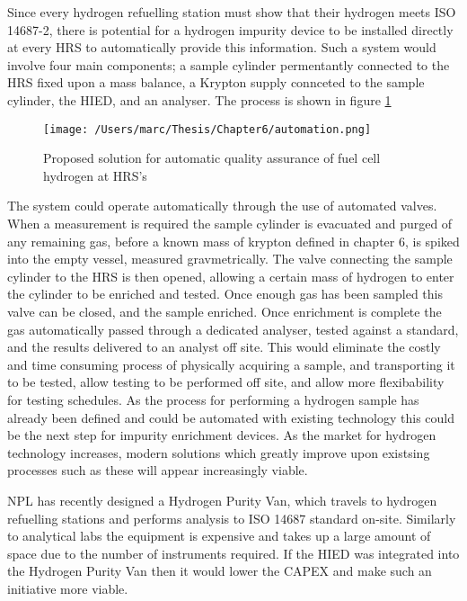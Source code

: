 Since every hydrogen refuelling station must show that their hydrogen meets ISO 14687-2, there is potential for a hydrogen impurity device to be installed directly at every HRS to automatically provide this information. Such a system would involve four main components; a sample cylinder permentantly connected to the HRS fixed upon a mass balance, a Krypton supply connceted to the sample cylinder, the HIED, and an analyser. The process is shown in figure \ref{autoprocedure}

\begin{figure}
    \centering
    \texttt{[image: /Users/marc/Thesis/Chapter6/automation.png]}
    \caption{Proposed solution for automatic quality assurance of fuel cell hydrogen at HRS's}
    \label{autoprocedure}
\end{figure}

The system could operate automatically through the use of automated valves. When a measurement is required the sample cylinder is evacuated and purged of any remaining gas, before a known mass of krypton defined in chapter 6, is spiked into the empty vessel, measured gravmetrically. The valve connecting the sample cylinder to the HRS is then opened, allowing a certain mass of hydrogen to enter the cylinder to be enriched and tested. Once enough gas has been sampled this valve can be closed, and the sample enriched. Once enrichment is complete the gas automatically passed through a dedicated analyser, tested against a standard, and the results delivered to an analyst off site. This would eliminate the costly and time consuming process of physically acquiring a sample, and transporting it to be tested, allow testing to be performed off site, and allow more flexibability for testing schedules. As the process for performing a hydrogen sample has already been defined \cite{BACQUART20205565} and could be automated with existing technology this could be the next step for impurity enrichment devices. As the market for hydrogen technology increases, modern solutions which greatly improve upon existsing processes such as these will appear increasingly viable.

NPL has recently designed a Hydrogen Purity Van, which travels to hydrogen refuelling stations and performs analysis to ISO 14687 standard on-site. Similarly to analytical labs the equipment is expensive and takes up a large amount of space due to the number of instruments required. If the HIED was integrated into the Hydrogen Purity Van then it would lower the CAPEX and make such an initiative more viable. 

